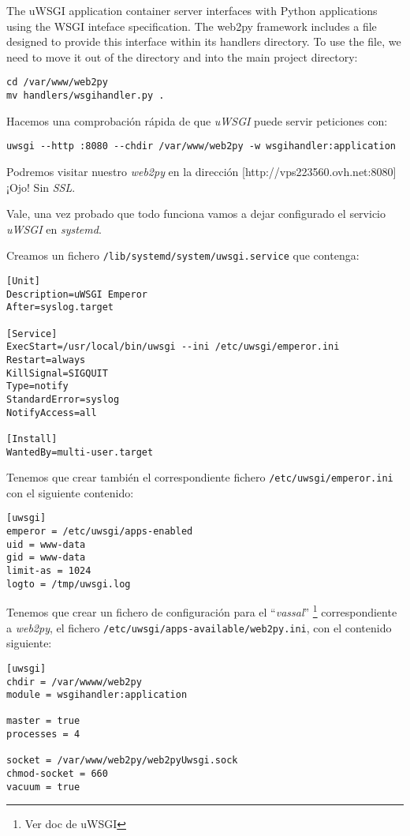 \documentclass[12pt,spanish,]{article}
\begin{document}
The uWSGI application container server interfaces with Python
applications using the WSGI inteface specification. The web2py framework
includes a file designed to provide this interface within its handlers
directory. To use the file, we need to move it out of the directory and
into the main project directory:

\begin{verbatim}
cd /var/www/web2py
mv handlers/wsgihandler.py .
\end{verbatim}

Hacemos una comprobación rápida de que \emph{uWSGI} puede servir
peticiones con:

\begin{verbatim}
uwsgi --http :8080 --chdir /var/www/web2py -w wsgihandler:application
\end{verbatim}

Podremos visitar nuestro \emph{web2py} en la dirección
{[}http://vps223560.ovh.net:8080{]} ¡Ojo! Sin \emph{SSL}.

Vale, una vez probado que todo funciona vamos a dejar configurado el
servicio \emph{uWSGI} en \emph{systemd}.

Creamos un fichero \texttt{/lib/systemd/system/uwsgi.service} que
contenga:

\begin{verbatim}
[Unit]
Description=uWSGI Emperor
After=syslog.target

[Service]
ExecStart=/usr/local/bin/uwsgi --ini /etc/uwsgi/emperor.ini
Restart=always
KillSignal=SIGQUIT
Type=notify
StandardError=syslog
NotifyAccess=all

[Install]
WantedBy=multi-user.target
\end{verbatim}

Tenemos que crear también el correspondiente fichero
\texttt{/etc/uwsgi/emperor.ini} con el siguiente contenido:

\begin{verbatim}
[uwsgi]
emperor = /etc/uwsgi/apps-enabled
uid = www-data
gid = www-data
limit-as = 1024
logto = /tmp/uwsgi.log
\end{verbatim}

Tenemos que crear un fichero de configuración para el ``\emph{vassal}''
\footnote{Ver doc de uWSGI} correspondiente a \emph{web2py}, el fichero
\texttt{/etc/uwsgi/apps-available/web2py.ini}, con el contenido
siguiente:

\begin{verbatim}
[uwsgi]
chdir = /var/wwww/web2py
module = wsgihandler:application

master = true
processes = 4

socket = /var/www/web2py/web2pyUwsgi.sock
chmod-socket = 660
vacuum = true
\end{verbatim}
\end{document}
